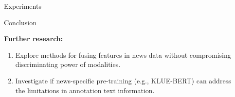 \documentclass[final]{beamer}
\newlength{\sepwidth}
\newlength{\colwidth}
\newcommand{\separatorcolumn}{\begin{column}{\sepwidth}\end{column}}
\newcommand{\bc}{\begin{center}}
\newcommand{\ec}{\end{center}}
\newcommand{\ben}{\begin{enumerate}}
\newcommand{\een}{\end{enumerate}}
\begin{document}
\begin{frame}[t]
\begin{columns}[t]
\begin{column}{\colwidth}
\begin{block}{Experiments}
\begin{itemize}
\end{itemize}





  \end{block}

    \begin{alertblock}{Conclusion}

    
    \textbf{Further research:}
    \ben
        \item Explore methods for fusing features in news data without compromising discriminating power of modalities.
        \item Investigate if news-specific pre-training (e.g., KLUE-BERT) can address the limitations in annotation text information.
    \een
    
    \end{alertblock}




\end{column}

\separatorcolumn
\end{columns}
\end{frame}
\end{document}
